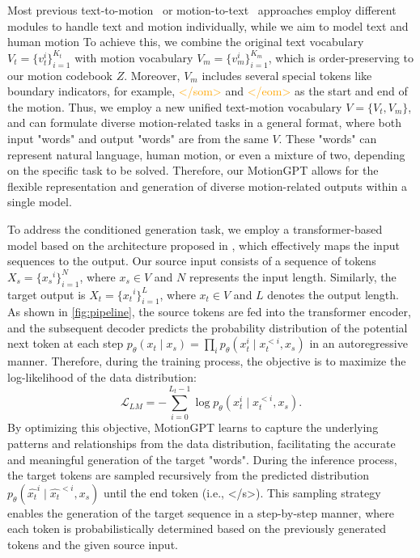 Most previous text-to-motion~\cite{chuan2022tm2t, chen2023mld, zhang2023generating} or motion-to-text~\cite{chuan2022tm2t} approaches employ different modules to handle text and motion individually, while we aim to model text and human motion  
%
To achieve this, we combine the original text vocabulary $V_t=\{{v}_t^i\}_{i=1}^{K_t}$ with motion vocabulary $V_m=\{{v}_m^i\}_{i=1}^{K_m}$, which is order-preserving to our motion codebook $Z$. 
Moreover, $V_m$ includes several special tokens like boundary indicators, for example, \textcolor{orange}{</som>} and \textcolor{orange}{</eom>} as the start and end of the motion.
%
Thus, we employ a new unified text-motion vocabulary $V = \{V_t, V_m\}$, and can formulate diverse motion-related tasks in a general format, where both input "words" and output "words" are from the same $V$.
%
These "words" can represent natural language, human motion, or even a mixture of two, depending on the specific task to be solved.
%
Therefore, our MotionGPT allows for the flexible representation and generation of diverse motion-related outputs within a single model.


To address the conditioned generation task, we employ a transformer-based model based on the architecture proposed in \cite{raffel2020t5}, which effectively maps the input sequences to the output.
%
Our source input consists of a sequence of tokens ${X_s}=\{{x_s}^i\}_{i=1}^{N}$, where $x_s\in V$ and $N$ represents the input length. Similarly, the target output is ${X_t}=\{{x_t}^i\}_{i=1}^{L}$, where $x_t\in V$ and $L$ denotes the output length.
%
As shown in \cref{fig:pipeline}, the source tokens are fed into the transformer encoder, and the subsequent decoder predicts the probability distribution of the potential next token at each step $p_\theta(x_t \mid x_s)=\prod_i p_\theta\left(x_t^i \mid x_t^{<i}, x_s\right)$ in an autoregressive manner. Therefore, during the training process, the objective is to maximize the log-likelihood of the data distribution:
\begin{equation}
    \mathcal{L}_{LM}=-\sum_{i=0}^{L_t-1} \log p_\theta\left(x_t^i \mid x_t^{<i}, x_s\right) .
    \label{eq:loss:lm}
\end{equation}
By optimizing this objective, MotionGPT learns to capture the underlying patterns and relationships from the data distribution, facilitating the accurate and meaningful generation of the target "words".
During the inference process, the target tokens are sampled recursively from the predicted distribution $p_\theta\left(\hat{x_t}^i \mid \hat{x_t}^{<i}, x_s\right)$ until the end token (i.e., \textcolor{NavyBlue}{</s>}). This sampling strategy enables the generation of the target sequence in a step-by-step manner, where each token is probabilistically determined based on the previously generated tokens and the given source input.


